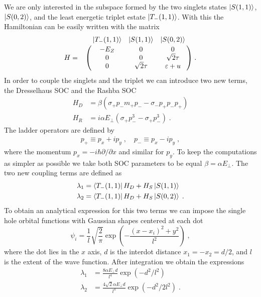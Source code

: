 \documentclass[a4paper,11pt]{article}
\begin{document}
We are only interested in the subspace formed by the two singlets states $\ket{S(1,1)}$, $\ket{S(0,2)}$, and the least energetic triplet estate $\ket{T_-(1,1)}$. With this the Hamiltonian can be easily written with the matrix
\begin{equation}
	H=\bordermatrix{~ & \ket{T_-(1,1)} & \ket{S(1,1)} & \ket{S(0,2)}\cr
		~ & -E_Z & 0 & 0 \cr
		~ & 0 & 0 & \sqrt{2}\tau \cr
		~ & 0 & \sqrt{2}\tau & \varepsilon+u \cr}\; .
\end{equation}
In order to couple the singlets and the triplet we can introduce two new terms, the Dresselhaus SOC and the Rashba SOC
\begin{equation}
	\begin{split}
	H_D&=\beta(\sigma_+p_-m_+p_--\sigma_-p_+p_-p_+)\\
	H_R&=i\alpha E_\perp (\sigma_+p_-^3-\sigma_+p_-^3)\; .
	\end{split}
\end{equation}
The ladder operators are defined by
\begin{equation}
	\begin{split}
	p_+\equiv p_x+ip_y\;, \quad p_-\equiv p_x-ip_y\;, 
	\end{split}
\end{equation}
where the momentum $p_x=-i\hbar \partial/\partial x$ and similar for $p_y$. To keep the computations as simpler as possible we take both SOC parameters to be equal $\beta=\alpha E_\perp$. The two new coupling terms are defined as
\begin{equation}
	\begin{split}
	\lambda_1&=\bra{T_-(1,1)}H_D+H_S\ket{S(1,1)}\\
	\lambda_2&=\bra{T_-(1,1)}H_D+H_S\ket{S(0,2)}\; .
	\end{split}
\end{equation}
To obtain an analytical expression for this two terms we can impose the single hole orbital functions with Gaussian shapes centered at each dot
\begin{equation}
	\psi_i=\frac{1}{l}\sqrt{\frac{2}{\pi}}\exp(-\frac{(x-x_i)^2+y^2}{l^2})\; ,
\end{equation} 
where the dot lies in the $x$ axis, $d$ is the interdot distance $x_1=-x_2=d/2$, and $l$ is the extent of the wave function. After integration we obtain the expressions
\begin{equation}
	\begin{split}
	\lambda_1&=\frac{8\alpha E_\perp d}{l^4}\exp(-d^2/l^2)\\
	\lambda_2&=\frac{4\sqrt{2}\alpha E_\perp d}{l^4}\exp(-d^2/2l^2)\; .
	\end{split}
\end{equation}
\end{document}
